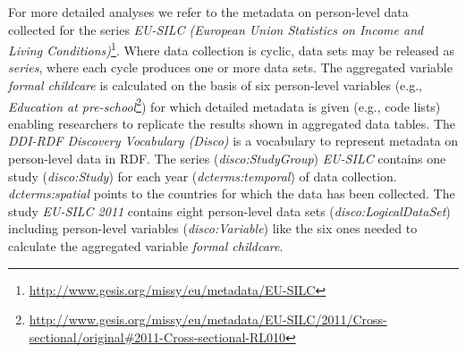 \documentclass{llncs}
\newcommand{\ke}[1]{\todo[size=\small, color=red!40]{\textbf{Kai:} #1}}
\newcommand{\tb}[1]{\todo[size=\small, color=green!40]{\textbf{Thomas:} #1}}
\begin{document}
For more detailed analyses we refer to the metadata on person-level data collected for the series \emph{EU-SILC (European Union Statistics on Income and Living Conditions)}\footnote{\url{http://www.gesis.org/missy/eu/metadata/EU-SILC}}. 
Where data collection is cyclic, data sets may be released as \emph{series}, 
where each cycle produces one or more data sets. 
The aggregated variable \emph{formal childcare} is calculated on the basis of six person-level variables 
(e.g., \emph{Education at pre-school}\footnote{\url{http://www.gesis.org/missy/eu/metadata/EU-SILC/2011/Cross-sectional/original#2011-Cross-sectional-RL010}})
for which detailed metadata is given 
(e.g., code lists)
enabling researchers to replicate the results shown in aggregated data tables.
The \emph{DDI-RDF Discovery Vocabulary (Disco)} is a vocabulary to represent metadata on person-level data in RDF.
The series (\emph{disco:StudyGroup}) \emph{EU-SILC} contains one study (\emph{disco:Study}) for each year (\emph{dcterms:temporal}) of data collection.   
\emph{dcterms:spatial} points to the countries for which the data has been collected.
The study \emph{EU-SILC 2011} contains eight person-level data sets (\emph{disco:LogicalDataSet})
including person-level variables (\emph{disco:Variable}) like the six ones needed to calculate the aggregated variable \emph{formal childcare}.
\end{document}
